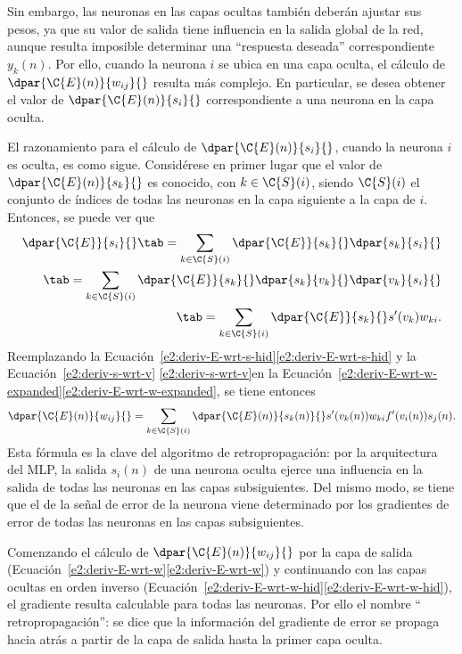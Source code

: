 Sin embargo, las neuronas en las capas ocultas también deberán ajustar
sus pesos, ya que su valor de salida tiene influencia en la salida
global de la red, aunque resulta imposible determinar una ``respuesta
deseada'' correspondiente $y_k(n)$.  Por ello, cuando la neurona $i$
se ubica en una capa oculta, el cálculo de $\dpar{\C{E}(n)}{w_{ij}}{}$
resulta más complejo.  En particular, se desea obtener el valor de
$\dpar{\C{E}(n)}{s_i}{}$ correspondiente a una neurona en la capa
oculta.

El razonamiento para el cálculo de $\dpar{\C{E}(n)}{s_{i}}{}$, cuando
la neurona $i$ es oculta, es como sigue. Considérese en primer lugar
que el valor de $\dpar{\C{E}(n)}{s_k}{}$ es conocido, con
$k\in{}\C{S}(i)$, siendo $\C{S}(i)$ el conjunto de índices de todas
las neuronas en la capa siguiente a la capa de $i$.  Entonces, se
puede ver que
%
\begin{align}\label{e2:deriv-E-wrt-s-hid}
  \dpar{\C{E}}{s_i}{} \tab= \sum_{k\in\C{S}(i)}
      \dpar{\C{E}}{s_k}{}\dpar{s_k}{s_i}{} \notag\\
    \tab= \sum_{k\in\C{S}(i)}
      \dpar{\C{E}}{s_k}{}\dpar{s_k}{v_k}{}\dpar{v_k}{s_i}{} \notag\\
    \tab= \sum_{k\in\C{S}(i)} \dpar{\C{E}}{s_k}{} s'(v_k) w_{ki}.
\end{align}
%
Reemplazando la
\iflatexml{}Ecuación~\ref{e2:deriv-E-wrt-s-hid}\else\autoref{e2:deriv-E-wrt-s-hid}\fi
y la \iflatexml{}Ecuación~\ref{e2:deriv-s-wrt-v}
\else\autoref{e2:deriv-s-wrt-v}\fi en la 
\iflatexml{}Ecuación~\ref{e2:deriv-E-wrt-w-expanded}\else\autoref{e2:deriv-E-wrt-w-expanded}\fi,
se tiene entonces
%
\begin{align}\label{e2:deriv-E-wrt-w-hid}
  \dpar{\C{E}(n)}{w_{ij}}{} =
  \sum_{k\in\C{S}(i)} \dpar{\C{E}(n)}{s_k(n)}{} s'(v_k(n)) w_{ki}
  f'(v_i(n)) s_j(n).
\end{align}
%
Esta fórmula es la clave del algoritmo de retropropagación: por la
arquitectura del MLP, la salida $s_i(n)$ de una neurona oculta ejerce
una influencia en la salida de todas las neuronas en las capas
subsiguientes.  Del mismo modo, se tiene que el  de
la señal de error de la neurona viene determinado por los gradientes
de error de todas las neuronas en las capas subsiguientes.

Comenzando el cálculo de $\dpar{\C{E}(n)}{w_{ij}}{}$ por la capa de
salida
(\iflatexml{}Ecuación~\ref{e2:deriv-E-wrt-w}\else\autoref{e2:deriv-E-wrt-w}\fi)
y continuando con las capas ocultas en orden inverso
(\iflatexml{}Ecuación~\ref{e2:deriv-E-wrt-w-hid}\else\autoref{e2:deriv-E-wrt-w-hid}\fi),
el gradiente resulta calculable para todas las neuronas.  Por ello el
nombre `` retropropagación'': se dice que la información del gradiente
de error se propaga hacia atrás a partir de la capa de salida hasta la
primer capa oculta.

